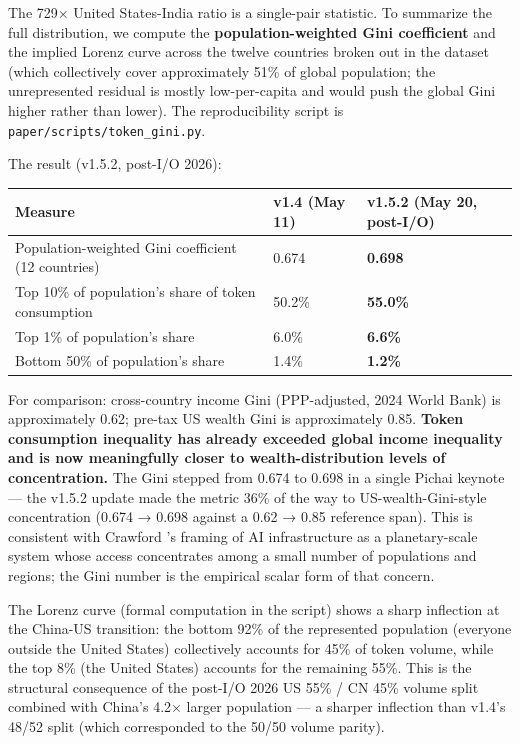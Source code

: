 \documentclass[11pt,a4paper]{article}
\begin{document}
The 729× United States-India ratio is a single-pair statistic. To summarize the full distribution, we compute the \textbf{population-weighted Gini coefficient} and the implied Lorenz curve across the twelve countries broken out in the dataset (which collectively cover approximately 51\% of global population; the unrepresented residual is mostly low-per-capita and would push the global Gini higher rather than lower). The reproducibility script is \texttt{paper/scripts/token\_gini.py}.

The result (v1.5.2, post-I/O 2026):

\begin{center}
\begin{tabular}{lll}
\toprule
Measure & v1.4 (May 11) & v1.5.2 (May 20, post-I/O) \\
\midrule
Population-weighted Gini coefficient (12 countries) & 0.674 & \textbf{0.698} \\
Top 10\% of population's share of token consumption & 50.2\% & \textbf{55.0\%} \\
Top 1\% of population's share & 6.0\% & \textbf{6.6\%} \\
Bottom 50\% of population's share & 1.4\% & \textbf{1.2\%} \\
\bottomrule
\end{tabular}
\end{center}


For comparison: cross-country income Gini (PPP-adjusted, 2024 World Bank) is approximately 0.62; pre-tax US wealth Gini is approximately 0.85. \textbf{Token consumption inequality has already exceeded global income inequality and is now meaningfully closer to wealth-distribution levels of concentration.} The Gini stepped from 0.674 to 0.698 in a single Pichai keynote --- the v1.5.2 update made the metric 36\% of the way to US-wealth-Gini-style concentration (0.674 → 0.698 against a 0.62 → 0.85 reference span). This is consistent with Crawford \cite{crawford2021atlas}'s framing of AI infrastructure as a planetary-scale system whose access concentrates among a small number of populations and regions; the Gini number is the empirical scalar form of that concern.

The Lorenz curve (formal computation in the script) shows a sharp inflection at the China-US transition: the bottom 92\% of the represented population (everyone outside the United States) collectively accounts for 45\% of token volume, while the top 8\% (the United States) accounts for the remaining 55\%. This is the structural consequence of the post-I/O 2026 US 55\% / CN 45\% volume split combined with China's 4.2× larger population --- a sharper inflection than v1.4's 48/52 split (which corresponded to the 50/50 volume parity).
\end{document}
